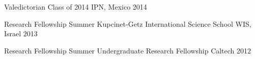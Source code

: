 \begin{cvhonors}

  \cvhonor
    {Valedictorian} %
    {Class of 2014} %
    {IPN, Mexico} %
    {2014} %

  \cvhonor
    {Research Fellowship}
    {Summer Kupcinet-Getz International Science School}
    {WIS, Israel} %
    {2013} %

  \cvhonor
    {Research Fellowship}
    {Summer Undergraduate Research Fellowship}
    {Caltech} %
    {2012} %
\end{cvhonors}
